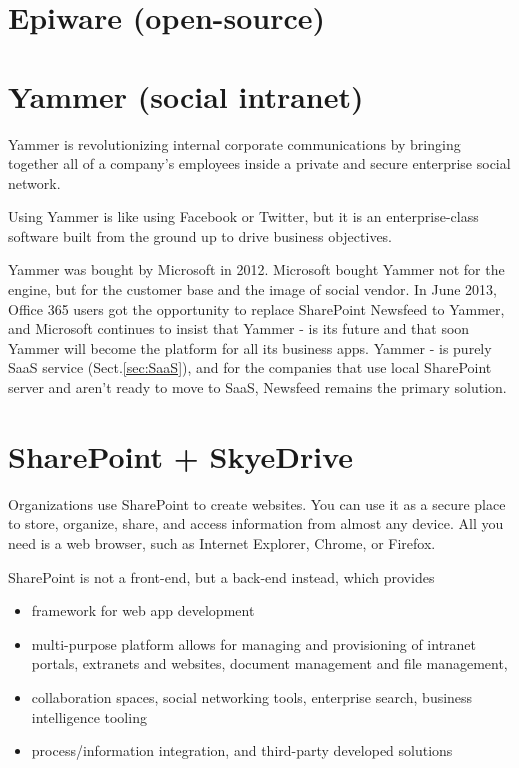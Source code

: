 \section{Epiware (open-source)}
\label{sec:EpiWare}



\section{Yammer (social intranet)}
\label{sec:Yammer}

Yammer is revolutionizing internal corporate communications by bringing together
all of a company's employees inside a private and secure enterprise social
network.

Using Yammer is like using Facebook or Twitter, but it is an enterprise-class
software built from the ground up to drive business objectives.

Yammer was bought by Microsoft in 2012.
Microsoft bought Yammer not for the engine, but for the customer base and the
image of  social vendor.
In June 2013, Office 365 users got the opportunity to replace SharePoint
Newsfeed to Yammer, and Microsoft continues to insist that Yammer - is its
future and that soon Yammer will become the platform for all its business apps.
Yammer - is purely SaaS service (Sect.\ref{sec:SaaS}), and for the companies
that use local SharePoint server and aren't ready to move to SaaS, Newsfeed
remains the primary solution.


\section{SharePoint + SkyeDrive}
\label{sec:SharePoint}

Organizations use SharePoint to create websites. You can use it as a secure
place to store, organize, share, and access information from almost any device.
All you need is a web browser, such as Internet Explorer, Chrome, or Firefox.


SharePoint is not a front-end, but a back-end instead, which provides
\begin{itemize}
  \item framework for web app development
  
  \item multi-purpose platform allows for managing and provisioning of intranet portals, extranets and websites, document management and file management,
  
  \item collaboration spaces, social networking tools, enterprise search, business intelligence tooling
  
  \item process/information integration, and third-party developed solutions
\end{itemize}

